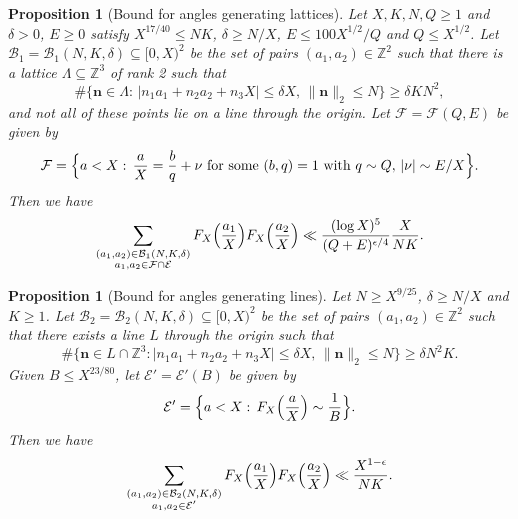 \documentclass[10pt]{amsart}
\theoremstyle{plain}
\newtheorem{prpstn}[thrm]{Proposition}
\numberwithin{sblmm}{thrm}
\numberwithin{equation}{section}
\begin{document}
\begin{prpstn}[Bound for angles generating lattices] \label{prpstn:LatticeBound}
%
Let $X,K,N,Q\ge 1$ and $\delta>0$, $E\ge 0$ satisfy $X^{17/40}\le N K$, $\delta\ge N/X$, $E\le 100X^{1/2}/Q$ and $Q\le X^{1/2}$. Let $\mathcal{B}_1=\mathcal{B}_1(N,K,\delta)\subseteq[0,X)^2$ be the set of pairs $(a_1,a_2)\in\mathbb{Z}^2$ such that there is a lattice $\Lambda\subseteq\mathbb{Z}^3$ of rank 2 such that
\[\#\{\mathbf{n}\in\Lambda:\,| n_1a_1+n_2a_2+n_3 X|\le \delta X,\,\|\mathbf{n}\|_2\le N\}\ge \delta K N^2,\]
and not all of these points lie on a line through the origin. Let $\mathcal{F}=\mathcal{F}(Q,E)$ be given by
\[
\mathcal{F}=\Bigl\{a<X:\, \frac{a}{X}=\frac{b}{q}+\nu\text{ for some }(b,q)=1\text{ with }q\sim Q,\,|\nu|\sim E/X\Bigr\}.
\]
Then we have
\[
\sum_{\substack{(a_1,a_2)\in\mathcal{B}_1(N,K,\delta)\\ a_1,a_2\in\mathcal{F}\cap\mathcal{E}}}F_X\Bigl(\frac{a_1}{X}\Bigr)F_X\Bigl(\frac{a_2}{X}\Bigr)
\ll \frac{(\log{X})^5}{(Q+E)^{\epsilon/4}}\frac{X}{N K}.
\]
%
\end{prpstn}
%
%
%
%
\begin{prpstn}[Bound for angles generating lines] \label{prpstn:LineBound}
%
Let $N\ge X^{9/25}$, $\delta\ge N/X$ and $K\ge 1$. Let $\mathcal{B}_2=\mathcal{B}_2(N,K,\delta)\subseteq[0,X)^2$ be the set of pairs $(a_1,a_2)\in\mathbb{Z}^2$ such that there exists a line $L$ through the origin such that
\[
\#\{\mathbf{n}\in L\cap\mathbb{Z}^3: |n_1a_1+n_2a_2+n_3X|\le \delta X,\,\|\mathbf{n}\|_2\le N\}\ge \delta N^2 K.
\]
Given $B\le X^{23/80}$, let $\mathcal{E}'=\mathcal{E}'(B)$ be given by
\[
\mathcal{E}'=\Bigl\{a<X:\,F_X\Bigl(\frac{a}{X}\Bigr)\sim \frac{1}{B}\Bigr\}.
\]
Then we have
\[
\sum_{\substack{(a_1,a_2)\in\mathcal{B}_2(N,K,\delta) \\ a_1,a_2\in\mathcal{E}'}}F_X\Bigl(\frac{a_1}{X}\Bigr)F_X\Bigl(\frac{a_2}{X}\Bigr)\ll \frac{X^{1-\epsilon}}{NK}.
\]
%
\end{prpstn}
%
%
%
%
\end{document}
